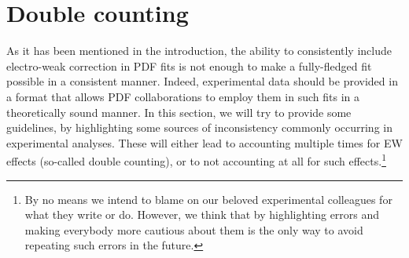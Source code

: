 \section{Double counting}
\label{sec:doublecounting}

As it has been mentioned in the introduction, the ability to consistently include electro-weak correction in
PDF fits is not enough to make a fully-fledged fit possible in a consistent manner. Indeed, experimental data should
be provided in  a format that allows PDF collaborations to employ them in such fits in a theoretically sound manner. In this
section, we will try to provide some guidelines, by highlighting some sources of inconsistency commonly occurring in experimental 
analyses. These will either lead to accounting multiple times for EW effects (so-called double counting), or to not accounting at
all for such effects.\footnote{By no means we intend to blame on our beloved experimental colleagues for what they write or do. However,
    we think that by highlighting errors and making everybody more cautious about them is the only way to avoid repeating such
    errors in the future.}

